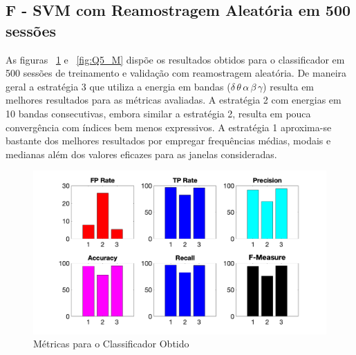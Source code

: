 \documentclass{article}
\begin{document}
\subsection*{F - SVM com Reamostragem Aleatória em 500 sessões}
As figuras ~\ref{fig:Q5_ROC} e ~\ref{fig:Q5_M} dispõe os resultados obtidos para o classificador em 500 sessões de treinamento e validação com reamostragem aleatória. De maneira geral a estratégia 3 que utiliza a energia em bandas ($\delta\, \theta\, \alpha\, \beta\, \gamma$) resulta em melhores resultados para as métricas avaliadas. A estratégia 2 com energias em 10 bandas consecutivas, embora similar a estratégia 2, resulta em pouca convergência com índices bem menos expressivos. A estratégia 1 aproxima-se bastante dos melhores resultados por empregar frequências médias, modais e medianas além dos valores eficazes para as janelas consideradas.


\begin{figure}[H]
	\begin{center}
		\includegraphics[scale=0.3]{../Q5_f.png}
		\caption{Métricas para o Classificador Obtido}
		\label{fig:Q5_ROC}
	\end{center}
\end{figure}
\end{document}
